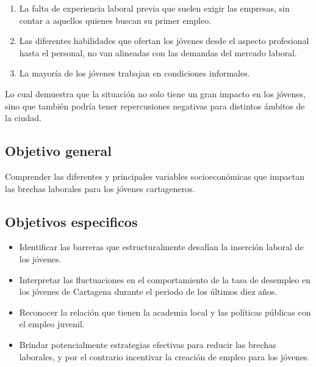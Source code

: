 \documentclass[letterpaper, 12pt]{article}
\begin{document}
\begin{enumerate}
      \item La falta de experiencia laboral previa que suelen exigir las empresas, sin contar a aquellos quienes buscan su primer empleo.
      
      \item Las diferentes habilidades que ofertan los jóvenes desde el aspecto profesional hasta el personal, no van alineadas con las demandas del mercado laboral.
      
      \item La mayoría de los jóvenes trabajan en condiciones informales. 
\end{enumerate}

Lo cual demuestra que la situación no solo tiene un gran impacto en los jóvenes, sino 
que también podría tener repercusiones negativas para distintos ámbitos de la ciudad. 

\subsection{Objetivo general}

Comprender las diferentes y principales variables socioeconómicas que impactan las 
brechas laborales para los jóvenes cartageneros.

\subsection{Objetivos especificos}

\begin{itemize}
      \item Identificar las barreras que estructuralmente desafían la inserción 
      laboral de los jóvenes. 
      
      \item Interpretar las fluctuaciones en el comportamiento de la tasa de 
      desempleo en los jóvenes de Cartagena durante el periodo de los últimos diez años. 

      \item Reconocer la relación que tienen la academia local y las políticas 
      públicas con el empleo juvenil. 

      \item Brindar potencialmente estrategias efectivas para reducir las brechas 
      laborales, y por el contrario incentivar la creación de empleo para los jóvenes.  
\end{itemize}
\end{document}
